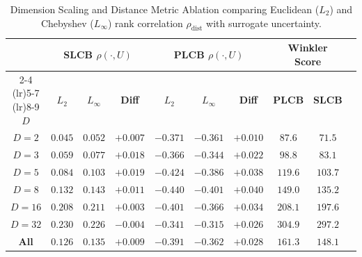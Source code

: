 \begin{table}[htbp]
\centering
\caption{Dimension Scaling and Distance Metric Ablation comparing Euclidean ($L_2$) and Chebyshev ($L_\infty$) rank correlation $\rho_{\text{dist}}$ with surrogate uncertainty.}
\label{tab:dimension_scaling_ablation}
\small
\begin{tabular}{c ccc ccc ccc}
\toprule
 & \multicolumn{3}{c}{\textbf{SLCB $\rho(\cdot, U)$}} & \multicolumn{3}{c}{\textbf{PLCB $\rho(\cdot, U)$}} & \multicolumn{2}{c}{\textbf{Winkler Score}} \\
\cmidrule(lr){2-4} \cmidrule(lr){5-7} \cmidrule(lr){8-9}
\textbf{$D$} & \textbf{$L_2$} & \textbf{$L_\infty$} & \textbf{Diff} & \textbf{$L_2$} & \textbf{$L_\infty$} & \textbf{Diff} & \textbf{PLCB} & \textbf{SLCB} \\
\midrule
$D=2$ & $0.045$ & $0.052$ & $+0.007$ & $-0.371$ & $-0.361$ & $+0.010$ & $87.6$ & $71.5$ \\
$D=3$ & $0.059$ & $0.077$ & $+0.018$ & $-0.366$ & $-0.344$ & $+0.022$ & $98.8$ & $83.1$ \\
$D=5$ & $0.084$ & $0.103$ & $+0.019$ & $-0.424$ & $-0.386$ & $+0.038$ & $119.6$ & $103.7$ \\
$D=8$ & $0.132$ & $0.143$ & $+0.011$ & $-0.440$ & $-0.401$ & $+0.040$ & $149.0$ & $135.2$ \\
$D=16$ & $0.208$ & $0.211$ & $+0.003$ & $-0.401$ & $-0.366$ & $+0.034$ & $208.1$ & $197.6$ \\
$D=32$ & $0.230$ & $0.226$ & $-0.004$ & $-0.341$ & $-0.315$ & $+0.026$ & $304.9$ & $297.2$ \\
\textbf{All} & $0.126$ & $0.135$ & $+0.009$ & $-0.391$ & $-0.362$ & $+0.028$ & $161.3$ & $148.1$ \\
\bottomrule
\end{tabular}
\end{table}